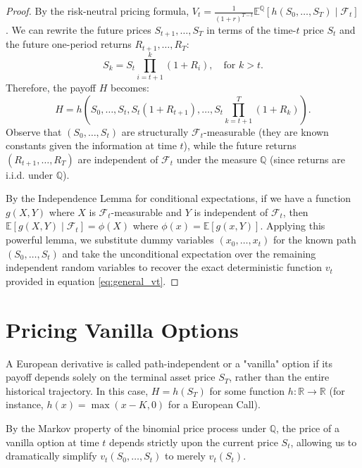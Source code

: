 \begin{proof}
    By the risk-neutral pricing formula, $V_t = \frac{1}{(1+r)^{T-t}} \mathbb{E}^\mathbb{Q}[h(S_0, \dots, S_T) \mid \mathcal{F}_t]$. 
    We can rewrite the future prices $S_{t+1}, \dots, S_T$ in terms of the time-$t$ price $S_t$ and the future one-period returns $R_{t+1}, \dots, R_T$:
    \begin{equation}
        S_k = S_t \prod_{i=t+1}^k (1+R_i), \quad \text{for } k > t.
    \end{equation}
    Therefore, the payoff $H$ becomes:
    \begin{equation}
        H = h\left(S_0, \dots, S_t, S_t(1+R_{t+1}), \dots, S_t \prod_{k=t+1}^T (1+R_k)\right).
    \end{equation}
    Observe that $(S_0, \dots, S_t)$ are structurally $\mathcal{F}_t$-measurable (they are known constants given the information at time $t$), while the future returns $(R_{t+1}, \dots, R_T)$ are independent of $\mathcal{F}_t$ under the measure $\mathbb{Q}$ (since returns are i.i.d. under $\mathbb{Q}$). 
    
    By the Independence Lemma for conditional expectations, if we have a function $g(X, Y)$ where $X$ is $\mathcal{F}_t$-measurable and $Y$ is independent of $\mathcal{F}_t$, then $\mathbb{E}[g(X,Y) \mid \mathcal{F}_t] = \phi(X)$ where $\phi(x) = \mathbb{E}[g(x, Y)]$.
    Applying this powerful lemma, we substitute dummy variables $(x_0, \dots, x_t)$ for the known path $(S_0, \dots, S_t)$ and take the unconditional expectation over the remaining independent random variables to recover the exact deterministic function $v_t$ provided in equation \eqref{eq:general_vt}.
\end{proof}

\section{Pricing Vanilla Options}

A European derivative is called path-independent or a "vanilla" option if its payoff depends solely on the terminal asset price $S_T$, rather than the entire historical trajectory. In this case, $H = h(S_T)$ for some function $h : \mathbb{R} \to \mathbb{R}$ (for instance, $h(x) = \max(x-K, 0)$ for a European Call).

By the Markov property of the binomial price process under $\mathbb{Q}$, the price of a vanilla option at time $t$ depends strictly upon the current price $S_t$, allowing us to dramatically simplify $v_t(S_0, \dots, S_t)$ to merely $v_t(S_t)$.

